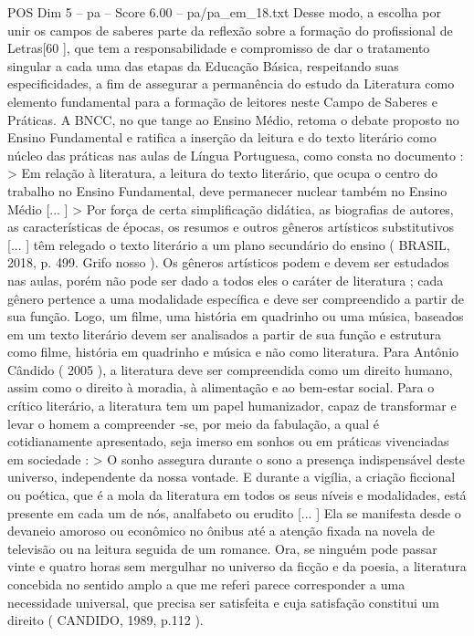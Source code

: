 \begin{textsample}{POS Dim 5 – pa – Score 6.00 – pa/pa\_em\_18.txt}
Desse modo, a escolha por unir os campos de saberes parte da reflexão sobre a formação do profissional de Letras[60 ], que tem a responsabilidade e compromisso de dar o tratamento singular a cada uma das etapas da Educação Básica, respeitando suas especificidades, a fim de assegurar a permanência do estudo da Literatura como elemento fundamental para a formação de leitores neste Campo de Saberes e Práticas.
A BNCC, no que tange ao Ensino Médio, retoma o debate proposto no Ensino Fundamental e ratifica a inserção da leitura e do texto literário como núcleo das práticas nas aulas de Língua Portuguesa, como consta no documento : > Em relação à literatura, a leitura do texto literário, que ocupa o centro do trabalho no Ensino Fundamental, deve permanecer nuclear também no Ensino Médio [... ] > Por força de certa simplificação didática, as biografias de autores, as características de épocas, os resumos e outros gêneros artísticos substitutivos [... ] têm relegado o texto literário a um plano secundário do ensino ( BRASIL, 2018, p. 499.
Grifo nosso ).
Os gêneros artísticos podem e devem ser estudados nas aulas, porém não pode ser dado a todos eles o caráter de literatura ; cada gênero pertence a uma modalidade específica e deve ser compreendido a partir de sua função.
Logo, um filme, uma história em quadrinho ou uma música, baseados em um texto literário devem ser analisados a partir de sua função e estrutura como filme, história em quadrinho e música e não como literatura.
Para Antônio Cândido ( 2005 ), a literatura deve ser compreendida como um direito humano, assim como o direito à moradia, à alimentação e ao bem-estar social.
Para o crítico literário, a literatura tem um papel humanizador, capaz de transformar e levar o homem a compreender -se, por meio da fabulação, a qual é cotidianamente apresentado, seja imerso em sonhos ou em práticas vivenciadas em sociedade : > O sonho assegura durante o sono a presença indispensável deste universo, independente da nossa vontade.
E durante a vigília, a criação ficcional ou poética, que é a mola da literatura em todos os seus níveis e modalidades, está presente em cada um de nós, analfabeto ou erudito [... ] Ela se manifesta desde o devaneio amoroso ou econômico no ônibus até a atenção fixada na novela de televisão ou na leitura seguida de um romance.
Ora, se ninguém pode passar vinte e quatro horas sem mergulhar no universo da ficção e da poesia, a literatura concebida no sentido amplo a que me referi parece corresponder a uma necessidade universal, que precisa ser satisfeita e cuja satisfação constitui um direito ( CANDIDO, 1989, p.112 ).

\end{textsample}
